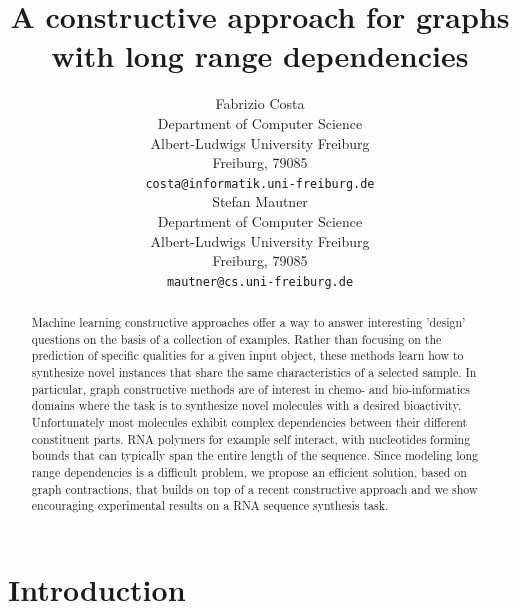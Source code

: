\documentclass{article}
\title{A constructive approach for graphs\\with long range dependencies}
\author{
  Fabrizio Costa \\
  Department of Computer Science\\
  Albert-Ludwigs University Freiburg\\
  Freiburg, 79085  \\
  \texttt{costa@informatik.uni-freiburg.de} \\
  \And
  Stefan Mautner\\
  Department of Computer Science\\
  Albert-Ludwigs University Freiburg\\
  Freiburg, 79085  \\
  \texttt{mautner@cs.uni-freiburg.de} \\
}
\begin{document}

\maketitle

\begin{abstract}

Machine learning constructive approaches offer a way to answer interesting
'design' questions on the basis of a collection of examples. Rather than
focusing on the prediction of specific qualities for a given input object,
these methods learn how to synthesize novel instances that share the same
characteristics of a selected sample. In particular, graph constructive
methods are of interest in chemo- and bio-informatics domains where the task
is to synthesize novel molecules with a desired bioactivity. Unfortunately
most molecules exhibit complex dependencies between their different
constituent parts. RNA polymers for example self interact, with nucleotides
forming bounds that can typically span the entire length of the sequence.
Since modeling long range dependencies is a
difficult problem, we propose an efficient solution, based on graph contractions,
that builds on top of a recent constructive approach and we show encouraging
experimental results on a RNA sequence synthesis task.






\end{abstract}
\section{Introduction}
\end{document}
